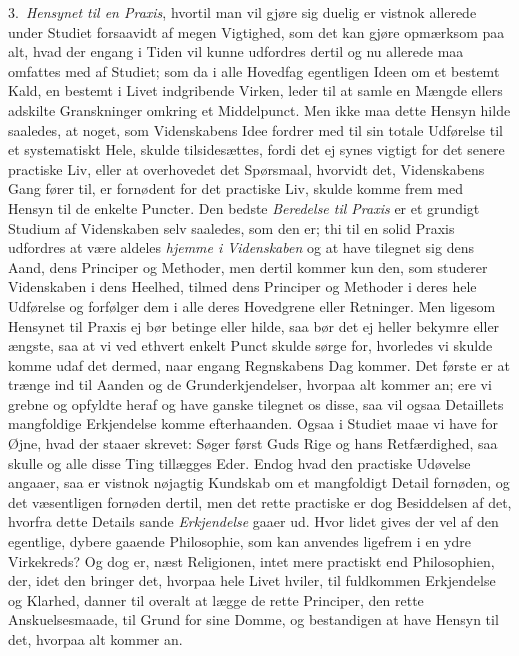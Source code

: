 \documentclass[12pt,a4paper]{book}
\newcommand{\apage}[1]{\marginnote{\footnotesize\textit{[#1]}}}
\begin{document}
3.~\emph{Hensynet til en Praxis}, hvortil man vil gjøre sig duelig er vistnok allerede
under Studiet forsaavidt af megen Vigtighed, som det kan gjøre opmærksom paa alt,
hvad der engang i Tiden vil kunne udfordres dertil og nu allerede maa omfattes med
af Studiet; som da i alle Hovedfag egentligen Ideen om et bestemt Kald, en bestemt
i Livet indgribende Virken, leder til at samle en Mængde ellers adskilte
Granskninger omkring et Middelpunct. Men ikke maa dette Hensyn hilde saaledes, at
noget, som Videnskabens Idee fordrer med til sin totale Udførelse til et
systematiskt Hele, skulde tilsidesættes, fordi det ej synes vigtigt for det senere
practiske Liv, eller at overhovedet det Spørsmaal, hvorvidt det, Videnskabens Gang
fører til, er fornødent for det practiske Liv, skulde komme frem med Hensyn til de
enkelte Puncter. Den bedste \apage{200} \emph{Beredelse til Praxis} er et grundigt Studium af
Videnskaben selv saaledes, som den er; thi til en solid Praxis udfordres at være
aldeles \emph{hjemme i Videnskaben} og at have tilegnet sig dens Aand, dens Principer og
Methoder, men dertil kommer kun den, som studerer Videnskaben i dens Heelhed,
tilmed dens Principer og Methoder i deres hele Udførelse og forfølger dem i alle
deres Hovedgrene eller Retninger. Men ligesom Hensynet til Praxis ej bør betinge
eller hilde, saa bør det ej heller bekymre eller ængste, saa at vi ved ethvert
enkelt Punct skulde sørge for, hvorledes vi skulde komme udaf det dermed, naar
engang Regnskabens Dag kommer. Det første er at trænge ind til Aanden og de
Grunderkjendelser, hvorpaa alt kommer an; ere vi grebne og opfyldte heraf og have
ganske tilegnet os disse, saa vil ogsaa Detaillets mangfoldige Erkjendelse komme
efterhaanden. Ogsaa i Studiet maae vi have for Øjne, hvad der staaer skrevet: Søger
først Guds Rige og hans Retfærdighed, saa skulle og alle disse Ting tillægges
Eder. Endog hvad den practiske Udøvelse angaaer, saa er vistnok nøjagtig Kundskab
om et mangfoldigt Detail fornøden, og det væsentligen fornøden dertil, men det
rette practiske er dog Besiddelsen af det, hvorfra dette Details sande \emph{Erkjendelse}
gaaer ud. Hvor lidet gives der vel af den egentlige, dybere gaaende Philosophie,
som kan anvendes ligefrem \apage{201}  i en ydre Virkekreds? Og dog er, næst Religionen, intet
mere practiskt end Philosophien, der, idet den bringer det, hvorpaa hele Livet
hviler, til fuldkommen Erkjendelse og Klarhed, danner til overalt at lægge de rette
Principer, den rette Anskuelsesmaade, til Grund for sine Domme, og bestandigen at
have Hensyn til det, hvorpaa alt kommer an.
\end{document}
